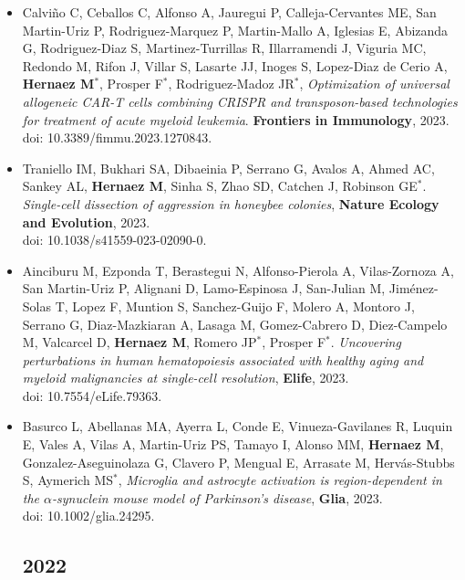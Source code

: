 \documentclass[11pt,a4paper,sans]{moderncv}        %
\begin{document}
\begin{itemize}
\item Calviño C, Ceballos C, Alfonso A, Jauregui P, Calleja-Cervantes ME, San Martin-Uriz P, Rodriguez-Marquez P, Martin-Mallo A, Iglesias E, Abizanda G, Rodriguez-Diaz S, Martinez-Turrillas R, Illarramendi J, Viguria MC, Redondo M, Rifon J, Villar S, Lasarte JJ, Inoges S, Lopez-Diaz de Cerio A, \textbf{Hernaez M}$^{\ast}$, Prosper F$^{\ast}$, Rodriguez-Madoz JR$^{\ast}$, \textsl{Optimization of universal allogeneic CAR-T cells combining CRISPR and transposon-based technologies for treatment of acute myeloid leukemia}. \textbf{Frontiers in Immunology}, 2023.\\
doi: 10.3389/fimmu.2023.1270843.\\

\item Traniello IM, Bukhari SA, Dibaeinia P, Serrano G, Avalos A, Ahmed AC, Sankey AL, \textbf{Hernaez M}, Sinha S, Zhao SD, Catchen J, Robinson GE$^{\ast}$. \textsl{Single-cell dissection of aggression in honeybee colonies}, \textbf{Nature Ecology and Evolution}, 2023.\\ 
doi: 10.1038/s41559-023-02090-0.\\

\item Ainciburu M, Ezponda T, Berastegui N, Alfonso-Pierola A, Vilas-Zornoza A, San Martin-Uriz P, Alignani D, Lamo-Espinosa J, San-Julian M, Jiménez-Solas T, Lopez F, Muntion S, Sanchez-Guijo F, Molero A, Montoro J, Serrano G, Diaz-Mazkiaran A, Lasaga M, Gomez-Cabrero D, Diez-Campelo M, Valcarcel D, \textbf{Hernaez M}, Romero JP$^{\ast}$, Prosper F$^{\ast}$. \textsl{Uncovering perturbations in human hematopoiesis associated with healthy aging and myeloid malignancies at single-cell resolution}, \textbf{Elife}, 2023.\\
doi: 10.7554/eLife.79363.\\

\item Basurco L, Abellanas MA, Ayerra L, Conde E, Vinueza-Gavilanes R, Luquin E, Vales A, Vilas A, Martin-Uriz PS, Tamayo I, Alonso MM, \textbf{Hernaez M}, Gonzalez-Aseguinolaza G, Clavero P, Mengual E, Arrasate M, Hervás-Stubbs S, Aymerich MS$^{\ast}$, \textsl{Microglia and astrocyte activation is region-dependent in the $\alpha$-synuclein mouse model of Parkinson's disease}, \textbf{Glia}, 2023.\\
doi: 10.1002/glia.24295.\\


\subsection{2022}
\vspace{6pt}


\end{itemize}
\end{document}

